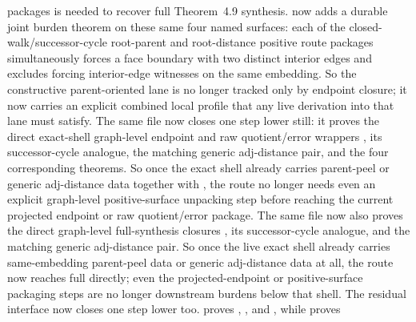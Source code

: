 \documentclass[11pt]{article}
\begin{document}
packages is needed to recover full Theorem~4.9 synthesis.
 now
adds a durable joint burden theorem on these same four named surfaces: each of
the closed-walk/successor-cycle root-parent and root-distance positive route
packages simultaneously forces a face boundary with two distinct interior
edges and excludes forcing interior-edge witnesses on the same embedding.  So
the constructive parent-oriented lane is no longer tracked only by endpoint
closure; it now carries an explicit combined local profile that any live
derivation into that lane must satisfy.  The same file now
closes one step lower still: it proves the direct exact-shell graph-level
endpoint and raw quotient/error wrappers
,
its successor-cycle analogue, the matching generic adj-distance pair, and the
four corresponding 
theorems.  So once the exact shell already carries parent-peel or generic
adj-distance data together with , the route
no longer needs even an explicit graph-level positive-surface unpacking step
before reaching the current projected endpoint or raw quotient/error package.
The same file now also proves the direct graph-level full-synthesis closures
,
its successor-cycle analogue, and the matching generic adj-distance pair.  So
once the live exact shell already carries same-embedding parent-peel data or
generic adj-distance data at all, the route now reaches full
 directly; even the projected-endpoint or
positive-surface packaging steps are no longer downstream burdens below that
shell.
The residual interface now closes one step lower too.
 proves
,
,
and
,
while  proves
\end{document}
